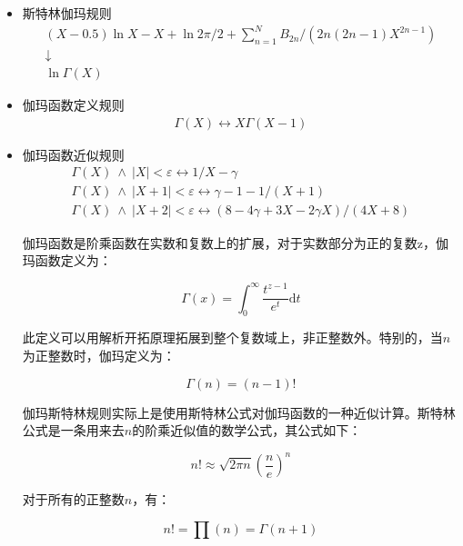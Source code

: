 \begin{itemize}

  \item {\kaishu 斯特林伽玛规则} 
  \begin{gather*}
  (X-0.5)\ln X-X+\ln {2\pi}/2+\sum _{n=1}^{N}{{B_{2n}}/(2n(2n-1)X^{2n-1})} \\
  \downarrow \\
  \ln \Gamma(X)
  \end{gather*}

  \item {\kaishu 伽玛函数定义规则} 
  \begin{gather*}
    \Gamma(X) \longleftrightarrow X\Gamma(X-1) 
  \end{gather*}

  \item {\kaishu 伽玛函数近似规则} 
  \begin{gather*}
  \Gamma(X)\ \wedge\ \left|X\right| < \varepsilon \longleftrightarrow 1/X - \gamma \\
  \Gamma(X)\ \wedge\ \left|X+1\right| < \varepsilon \longleftrightarrow \gamma - 1 - 1/(X + 1) \\
  \Gamma(X)\ \wedge\ \left|X+2\right| < \varepsilon \longleftrightarrow (8 - 4 \gamma + 3 X - 2 \gamma X)/(4X + 8)
  \end{gather*}

  伽玛函数是阶乘函数在实数和复数上的扩展，对于实数部分为正的复数z，伽玛函数定义为：

  \begin{equation*}
    \Gamma (x) = \int_{0}^{\infty} \frac{t^{z-1}}{e^t} \mathrm{d}t 
  \end{equation*}

  此定义可以用解析开拓原理拓展到整个复数域上，非正整数外。特别的，当$n$为正整数时，伽玛定义为：

  \begin{equation*}
    \Gamma (n) = (n-1)!
  \end{equation*}

  伽玛斯特林规则实际上是使用斯特林公式对伽玛函数的一种近似计算。斯特林公式是一条用来去$n$的阶乘近似值的数学公式，其公式如下：

  \begin{equation*}
    n! \approx \sqrt{2\pi n}(\frac{n}{e})^n
  \end{equation*}

  对于所有的正整数$n$，有：

  \begin{equation*}
    n! = \prod (n) = \Gamma (n+1)
  \end{equation*}


\end{itemize}
